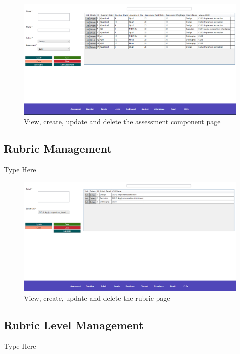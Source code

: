 \documentclass[12pt,a4paper]{article}
\begin{document}
\begin{figure}[H]
  \centering
  \includegraphics[scale=0.5]{GUIAssessmentComponent}

  \caption{View, create, update and delete the assessment component page}
\end{figure}

\subsection{Rubric Management}
Type Here

\begin{figure}[H]
  \centering
  \includegraphics[scale=0.5]{GUIRubric}

  \caption{View, create, update and delete the rubric page}
\end{figure}

\subsection{Rubric Level Management}
Type Here
\end{document}

